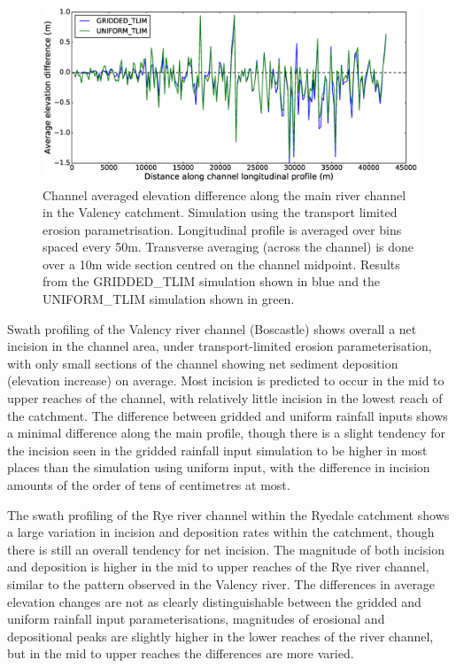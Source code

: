\begin{figure}[htb]
\includegraphics[width=14cm]{chp06_figures_scripts/fig_swath_profile_ryedale_erode_tlim.eps}
\caption{Channel averaged elevation difference along the main river channel in the Valency catchment. Simulation using the transport limited erosion parametrisation. Longitudinal profile is averaged over bins spaced every 50m. Transverse averaging (across the channel) is done over a 10m wide section centred on the channel midpoint. Results from the GRIDDED\_TLIM simulation shown in blue and the UNIFORM\_TLIM simulation shown in green.}
\label{fig_ryedale_swath_tlim}
\end{figure}

Swath profiling of the Valency river channel (Boscastle) shows overall a net incision in the channel area, under transport-limited erosion parameterisation, with only small sections of the channel showing net sediment deposition (elevation increase) on average. Most incision is predicted to occur in the mid to upper reaches of the channel, with relatively little incision in the lowest reach of the catchment. The difference between gridded and uniform rainfall inputs shows a minimal difference along the main profile, though there is a slight tendency for the incision seen in the gridded rainfall input simulation to be higher in most places than the simulation using uniform input, with the difference in incision amounts of the order of tens of centimetres at most.

The swath profiling of the Rye river channel within the Ryedale catchment shows a large variation in incision and deposition rates within the catchment, though there is still an overall tendency for net incision. The magnitude of both incision and deposition is higher in the mid to upper reaches of the Rye river channel, similar to the pattern observed in the Valency river. The differences in average elevation changes are not as clearly distinguishable between the gridded and uniform rainfall input parameterisations, magnitudes of erosional and depositional peaks are slightly higher in the lower reaches of the river channel, but in the mid to upper reaches the differences are more varied. 
 
